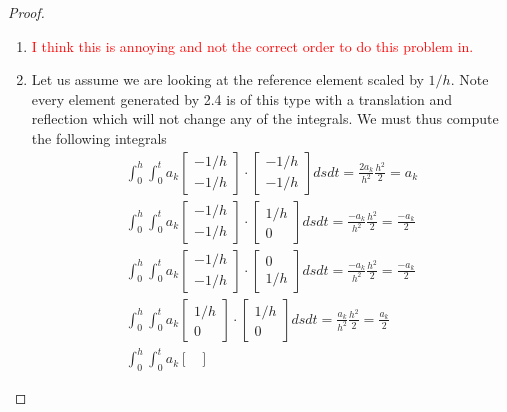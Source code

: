 \documentclass{amsart}
\theoremstyle{plain}
\theoremstyle{definition}
\newcommand{\tcr}[1]{\textcolor{red}{#1}}
\begin{document}
\begin{proof}
\begin{enumerate}[label=\alph*.]
    \item \tcr{I think this is annoying and not the correct order to do this problem in.}
    \item Let us assume we are looking at the reference element scaled by $1/h$. Note every element generated by 2.4 is of this type with a translation and reflection which will not change any of the integrals. We must thus compute  the following integrals
    \begin{align*}
        \int_0^h \int_0^t a_k \begin{bmatrix}
            -1/h\\-1/h
        \end{bmatrix}\cdot\begin{bmatrix}
            -1/h\\-1/h
        \end{bmatrix} ds dt = \frac{2a_k}{h^2}\frac{h^2}{2}=a_k\\
        \int_0^h \int_0^t a_k \begin{bmatrix}
            -1/h\\-1/h
        \end{bmatrix}\cdot\begin{bmatrix}
            1/h\\0
        \end{bmatrix} ds dt = \frac{-a_k}{h^2}\frac{h^2}{2}=\frac{-a_k}{2}\\
        \int_0^h \int_0^t a_k \begin{bmatrix}
            -1/h\\-1/h
        \end{bmatrix}\cdot\begin{bmatrix}
            0\\1/h
        \end{bmatrix} ds dt = \frac{-a_k}{h^2}\frac{h^2}{2}=\frac{-a_k}{2}\\
        \int_0^h \int_0^t a_k \begin{bmatrix}
            1/h\\0
        \end{bmatrix}\cdot\begin{bmatrix}
            1/h\\0
        \end{bmatrix} ds dt = \frac{a_k}{h^2}\frac{h^2}{2}=\frac{a_k}{2}\\
        \int_0^h \int_0^t a_k \begin{bmatrix}

\end{bmatrix}
\end{align*}
\end{enumerate}
\end{proof}
\end{document}
